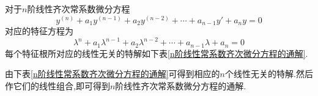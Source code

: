 \theorem[$n$阶线性常系数齐次微分方程的通解]
对于$n$阶线性齐次常系数微分方程
\begin{equation}
	y^{(n)}+a_1y^{(n-1)}+a_2y^{(n-2)}+\cdots+a_{n-1}y'+a_ny=0
\end{equation}
对应的特征方程为
\begin{equation}
	\lambda^n+a_1\lambda^{n-1}+a_2\lambda^{n-2}+\cdots +a_{n-1}\lambda +a_n=0
\end{equation}
每个特征根所对应的线性无关的特解如下表\ref{n阶线性常系数齐次微分方程的通解}.
\begin{table}[!htb]
	\centering
	\renewcommand{\arraystretch}{1}
	\caption{$n$阶线性常系数齐次微分方程的通解}
	\renewcommand{\arraystretch}{1}
	\label{n阶线性常系数齐次微分方程的通解}
\end{table} 
\par 由下表\ref{n阶线性常系数齐次微分方程的通解}可得到相应的$n$个线性无关的特解.然后作它们的线性组合,即可得到$n$阶线性齐次常系数微分方程的通解.

